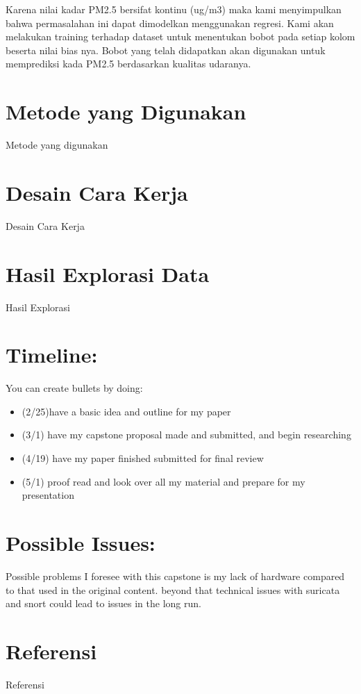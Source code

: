 \documentclass{article}
\begin{document}
\begin{normalsize}
        Karena nilai kadar PM2.5 bersifat kontinu (ug/m3) maka kami menyimpulkan bahwa permasalahan ini
        dapat dimodelkan menggunakan regresi. Kami akan melakukan training terhadap dataset untuk menentukan
        bobot pada setiap kolom beserta nilai bias nya. Bobot yang telah didapatkan akan digunakan untuk
        memprediksi kada PM2.5 berdasarkan kualitas udaranya.
        
        \section{Metode yang Digunakan}

        Metode yang digunakan

        \section{Desain Cara Kerja}

        Desain Cara Kerja
        
        \section{Hasil Explorasi Data}
        
        Hasil Explorasi
        
    	\section{Timeline:}
        
        \noindent You can create bullets by doing:
        
        \begin{itemize}
            \item(2/25)have a basic idea and outline for my paper
            \item (3/1) have my capstone proposal made and submitted, and begin researching
            \item(4/19) have my paper finished submitted for final review
            \item(5/1) proof read and look over all my material and prepare for my presentation
        \end{itemize}
        
    	\section{Possible Issues:}
        Possible problems I foresee with this capstone is my lack of hardware compared to that used in the original content. beyond that technical issues with suricata and snort could lead to issues in the long run.

        \section{Referensi}

        Referensi
    \end{normalsize}
  
\end{document}
